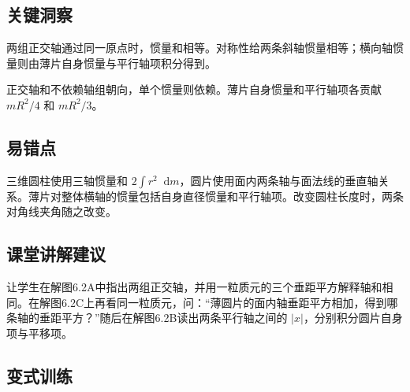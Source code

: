 \documentclass[UTF8,fontset=fandol,a4paper,11pt]{ctexart}
\newcommand{\dd}{\mathop{}\!\mathrm{d}}
\begin{document}
\subsection*{关键洞察}

两组正交轴通过同一原点时，惯量和相等。对称性给两条斜轴惯量相等；横向轴惯量则由薄片自身惯量与平行轴项积分得到。

正交轴和不依赖轴组朝向，单个惯量则依赖。薄片自身惯量和平行轴项各贡献 $mR^2/4$ 和 $mR^2/3$。



\subsection*{易错点}

三维圆柱使用三轴惯量和 $2\int r^2\dd m$，圆片使用面内两条轴与面法线的垂直轴关系。薄片对整体横轴的惯量包括自身直径惯量和平行轴项。改变圆柱长度时，两条对角线夹角随之改变。



\subsection*{课堂讲解建议}

让学生在解图6.2A中指出两组正交轴，并用一粒质元的三个垂距平方解释轴和相同。在解图6.2C上再看同一粒质元，问：“薄圆片的面内轴垂距平方相加，得到哪条轴的垂距平方？”随后在解图6.2B读出两条平行轴之间的 $|x|$，分别积分圆片自身项与平移项。




\subsection*{变式训练}
\end{document}
